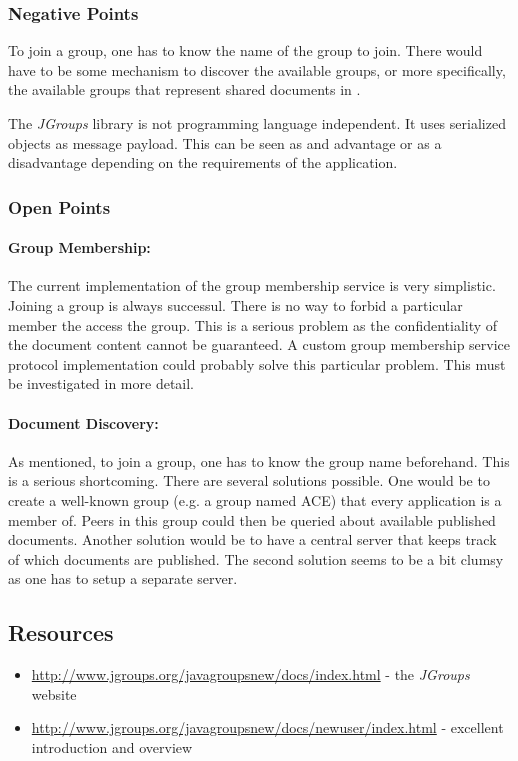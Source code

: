 \subsubsection{Negative Points}
To join a group, one has to know the name of the group to join. There would have to be some mechanism to discover the available groups, or more specifically, the available groups that represent shared documents in \ace. 

The \emph{JGroups} library is not programming language independent. It uses serialized objects as message payload. This can be seen as and advantage or as a disadvantage depending on the requirements of the application.

\subsubsection{Open Points}
\paragraph{Group Membership:} The current implementation of the group membership service is very simplistic. Joining a group is always successul. There is no way to forbid a particular member the access the group. This is a serious problem as the confidentiality of the document content cannot be guaranteed. A custom group membership service protocol implementation could probably solve this particular problem. This must be investigated in more detail.

\paragraph{Document Discovery:} As mentioned, to join a group, one has to know the group name beforehand. This is a serious shortcoming. There are several solutions possible. One would be to create a well-known group (e.g. a group named ACE) that every application is a member of. Peers in this group could then be queried about available published documents. Another solution would be to have a central server that keeps track of which documents are published. The second solution seems to be a bit clumsy as one has to setup a separate server.


\subsection{Resources}
\begin{itemize}
 \item \url{http://www.jgroups.org/javagroupsnew/docs/index.html} - the \emph{JGroups} website
 \item \url{http://www.jgroups.org/javagroupsnew/docs/newuser/index.html} - excellent introduction and overview
\end{itemize}
